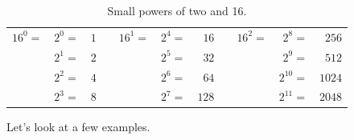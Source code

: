     \begin{table}[hbtp]
        \centering
        \begin{tabular}{llrrllrrlrr}
            $16^0=$ & $2^0=$ & $1$ & \hspace{0.5in} & $16^1=$ & $2^4=$ & $16 $ & \hspace{0.5in} & $16^2=$ & $2^8=$ & $256$  \\
            & $2^1=$ & $2$ &&& $2^5=$ & $32$ &&& $2^9=$ & $512$ \\
            & $2^2=$ & $4$ &&& $2^6=$ & $64$ &&& $2^{10}=$ & $1024$ \\
            & $2^3=$ & $8$ &&& $2^7=$ & $128$ &&& $2^{11}=$ & $2048$ \\
        \end{tabular}
        \caption{Small powers of two and 16.}
        \label{table_powers_2and16}
    \end{table}

Let's look at a few examples.

